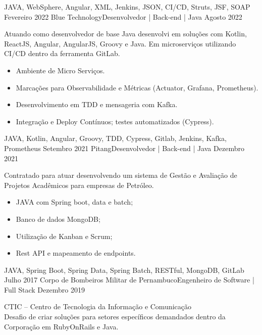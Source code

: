 \begin{experiences}
{\begin{itemize}
            \end{itemize}
            }
            {JAVA, WebSphere, Angular, XML, Jenkins, JSON, CI/CD, Struts, JSF, SOAP}
    \emptySeparator
    \experience
        {Fevereiro 2022}   {Blue Technology}{Desenvolvedor | Back-end | Java}{}
        {Agosto 2022} { Atuando como desenvolvedor de base Java desenvolvi em soluções com Kotlin, ReactJS, Angular, AngularJS, Groovy e Java. Em microserviços utilizando CI/CD dentro da ferramenta GitLab.
                    \begin{itemize}
                        \item Ambiente de Micro Serviços.
                        \item Marcações para Observabilidade e Métricas (Actuator, Grafana, Prometheus).
                        \item Desenvolvimento em TDD e mensageria com Kafka.
                        \item Integração e Deploy Contínuos; testes automatizados (Cypress).
                    \end{itemize}
                    }
                    {JAVA, Kotlin, Angular, Groovy, TDD, Cypress, Gitlab, Jenkins, Kafka, Prometheus}
    \emptySeparator
    \experience
            {Setembro 2021}   {Pitang}{Desenvolvedor | Back-end | Java}{}
            {Dezembro 2021} { Contratado para atuar desenvolvendo um sistema de Gestão e Avaliação de Projetos Acadêmicos para empresas de Petróleo.
                    \begin{itemize}
                        \item JAVA com Spring boot, data e batch;
                        \item Banco de dados MongoDB;
                        \item Utilização de Kanban e Scrum;
                        \item Rest API e mapeamento de endpoints.
                    \end{itemize}
                    }
                    {JAVA, Spring Boot, Spring Data, Spring Batch, RESTful, MongoDB, GitLab}
    \emptySeparator
    \experience
            {Julho 2017} {Corpo de Bombeiros Militar de Pernambuco}{Engenheiro de Software | Full Stack}{}
            {Dezembro 2019} { CTIC – Centro de Tecnologia da Informação e Comunicação\\
            Desafio de criar soluções para setores específicos demandados dentro da Corporação em RubyOnRails e Java.
                    \begin{itemize}

\end{itemize}}
\end{experiences}
